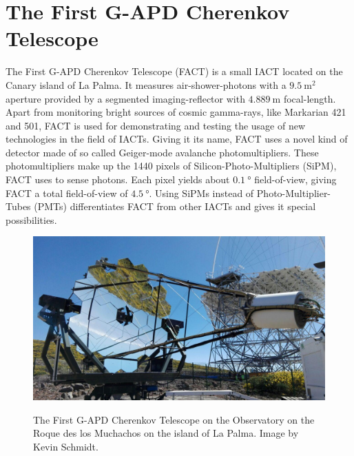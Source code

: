 \chapter{The First G-APD Cherenkov Telescope}

The First G-APD Cherenkov Telescope (FACT) is a small IACT located on the Canary island of La Palma.
It measures air-shower-photons with a $\SI{9.5}{\meter\squared}$ aperture provided by a segmented imaging-reflector with $\SI{4.889}{\meter}$ focal-length.
Apart from monitoring bright sources of cosmic gamma-rays, like Markarian 421 and 501, FACT is used for demonstrating and testing the usage of new technologies in the field of IACTs. Giving it its name, FACT uses a novel kind of detector made of so called Geiger-mode avalanche photomultipliers. These photomultipliers make up the 1440 pixels of Silicon-Photo-Multipliers (SiPM), FACT uses to sense photons. Each pixel yields about $\SI{0.1}{\degree}$ field-of-view, giving FACT a total field-of-view of $\SI{4.5}{\degree}$. Using SiPMs instead of Photo-Multiplier-Tubes (PMTs) differentiates FACT from other IACTs and gives it special possibilities.

\begin{figure}
  \centering
  \includegraphics[width=\textwidth]{Plots/fact.jpg}
  \label{fig:fact}
  \caption{The First G-APD Cherenkov Telescope on the Observatory on the Roque des los Muchachos on the island of La Palma. Image by Kevin Schmidt.}
\end{figure}
